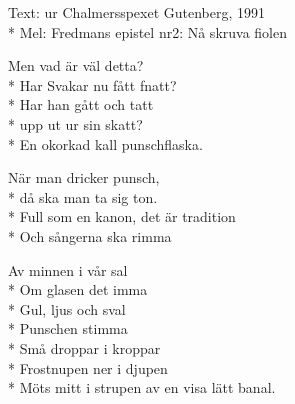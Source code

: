 \begin{SongText}
    \begin{SongInfo}
        Text: ur Chalmersspexet Gutenberg, 1991\\*%
        Mel: Fredmans epistel nr2: Nå skruva fiolen
    \end{SongInfo}
    \begin{SongVerse}
        Men vad är väl detta?\\*%
        Har Svakar nu fått fnatt?\\*%
        Har han gått och tatt\\*%
        upp ut ur sin skatt?\\*%
        En okorkad kall punschflaska.
    \end{SongVerse}
    \begin{SongVerse}
        När man dricker punsch,\\*%
        då ska man ta sig ton.\\*%
        Full som en kanon, det är tradition\\*%
        Och sångerna ska rimma
    \end{SongVerse}
    \begin{SongVerse}
        Av minnen i vår sal\\*%
        Om glasen det imma\\*%
        Gul, ljus och sval\\*%
        Punschen stimma\\*%
        Små droppar i kroppar\\*%
        Frostnupen ner i djupen\\*%
        Möts mitt i strupen av en visa lätt banal.
    \end{SongVerse}\end{SongText}
